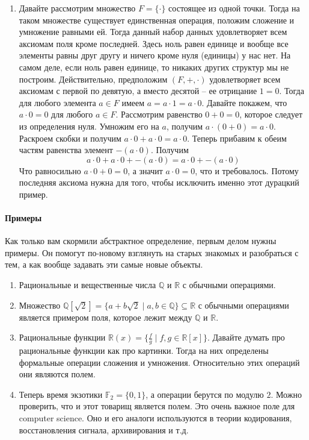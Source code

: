 \begin{enumerate}
\item Давайте рассмотрим множество $F=\{\cdot\}$ состоящее из одной точки.
Тогда на таком множестве существует единственная операция, положим сложение и умножение равными ей.
Тогда данный набор данных удовлетворяет всем аксиомам поля кроме последней.
Здесь ноль равен единице и вообще все элементы равны друг другу и ничего кроме  нуля (единицы) у нас  нет.
На самом деле, если ноль равен единице, то никаких других структур мы не построим.
Действительно, предположим $(F, +, \cdot)$ удовлетворяет всем аксиомам с первой по девятую, а вместо десятой -- ее отрицание $1 = 0$.
Тогда для любого элемента $a\in F$ имеем $a = a \cdot 1 = a \cdot 0$.
Давайте покажем, что $a \cdot 0 = 0$ для любого $a\in F$.
Рассмотрим равенство $0 + 0 = 0$, которое следует из определения нуля.
Умножим его на $a$, получим $a\cdot (0 + 0) = a \cdot 0$.
Раскроем скобки и получим $a \cdot 0 + a\cdot 0 = a\cdot 0$.
Теперь прибавим к обеим частям равенства элемент $- (a\cdot 0)$.
Получим
\[
a \cdot 0 + a\cdot 0 + - (a\cdot 0) = a\cdot 0 + - (a\cdot 0)
\]
Что равносильно $a\cdot 0 + 0 = 0$, а значит $a\cdot 0 = 0$, что и требовалось.
Потому последняя аксиома нужна для того, чтобы исключить именно этот дурацкий пример.
\end{enumerate}

\paragraph{Примеры}

Как только вам скормили абстрактное определение, первым делом нужны примеры.
Он помогут по-новому взглянуть на старых знакомых и разобраться с тем, а как вообще задавать эти самые новые объекты.

\begin{enumerate}
\item Рациональные и вещественные числа $\mathbb Q$ и $\mathbb R$ с обычными операциями.

\item Множество $\mathbb Q[\sqrt{2}] = \{a + b \sqrt{2}\mid a,b\in\mathbb Q\}\subseteq \mathbb R$ с обычными операциями является примером поля, которое лежит между $\mathbb Q$ и $\mathbb R$.

\item Рациональные функции $\mathbb R(x) = \{\frac{f}{g}\mid f,g\in\mathbb R[x]\}$.
Давайте думать про рациональные функции как про картинки.
Тогда на них определены формальные операции сложения и умножения.
Относительно этих операций они являются полем.

\item Теперь время экзотики $\mathbb F_2 =\{0, 1\}$, а операции берутся по модулю $2$.
Можно проверить, что и этот товарищ является полем.
Это очень важное поле для computer science.
Оно и его аналоги используются в теории кодирования, восстановления сигнала, архивирования и т.д.
\end{enumerate}



